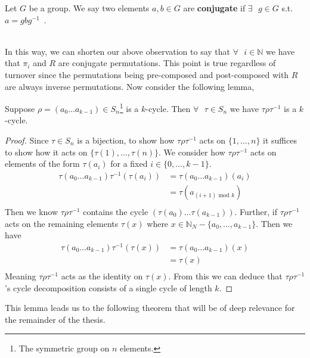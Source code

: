 \begin{definition}
  Let $G$ be a group. We say two elements $a,b\in{G}$ are
  {\bf{conjugate}} if $\exists\text{ }g\in{G}$ s.t. $a=gbg^{-1}$~\cite[p.~50]{artin2011algebra}.
\end{definition}
\text{}\\In this way, we can shorten our above observation to say that
$\forall\text{ }i\in\mathbb{N}$ we have that $\pi_i$ and $R$ are
conjugate permutations. This point is true regardless of turnover
since the permutations being pre-composed and post-composed with $R$
are always inverse permutations. Now consider the following lemma,\\
\begin{lemma}
  Suppose $\rho=(a_0\dots a_{k-1})\in S_n$\footnote{The symmetric group on $n$ elements.} is a $k$-cycle. Then
  $\forall\text{ }\tau\in S_n$ we have
  $\tau\rho\tau^{-1}$ is a $k$-cycle.
  \label{conjugate_cycle}
\end{lemma}
\begin{proof}
  Since $\tau\in S_n$ is a bijection, to show how $\tau\rho\tau^{-1}$
  acts on $\{1,\dots, n\}$ it suffices to show how it acts on
  $\{\tau(1), \dots, \tau(n)\}$.
  We consider how $\tau\rho\tau^{-1}$ acts on elements of the form
  $\tau(a_i)$ for a fixed $i\in\{0,\dots,k-1\}$.
  \begin{align*}
    \tau(a_0\dots a_{k-1})\tau^{-1}(\tau(a_i)) & = \tau(a_0\dots
    a_{k-1})(a_i)
    \\
    & = \tau(a_{(i+1)\text{ mod }k}) \\
  \end{align*}
  Then we know $\tau\rho\tau^{-1}$ contains the cycle
  $(\tau(a_0)\dots \tau(a_{k-1}))$.
  Further, if $\tau\rho\tau^{-1}$ acts on the remaining elements
  $\tau(x)$ where $x\in\mathbb{N}_N - \{a_0,\dots,a_{k-1}\}$.
  Then we have
  \begin{align*}
    \tau(a_0\dots a_{k-1})\tau^{-1}(\tau(x)) & = \tau(a_0\dots a_{k-1})(x) \\
    & = \tau(x)                   \\
  \end{align*}
  Meaning $\tau\rho\tau^{-1}$ acts as the identity on $\tau(x)$. From
  this we can deduce that
  $\tau\rho\tau^{-1}$'s cycle decomposition consists of a single
  cycle of length $k$.
\end{proof}

\noindent This lemma leads us to the following theorem that will be of deep
relevance for the remainder of the thesis.

